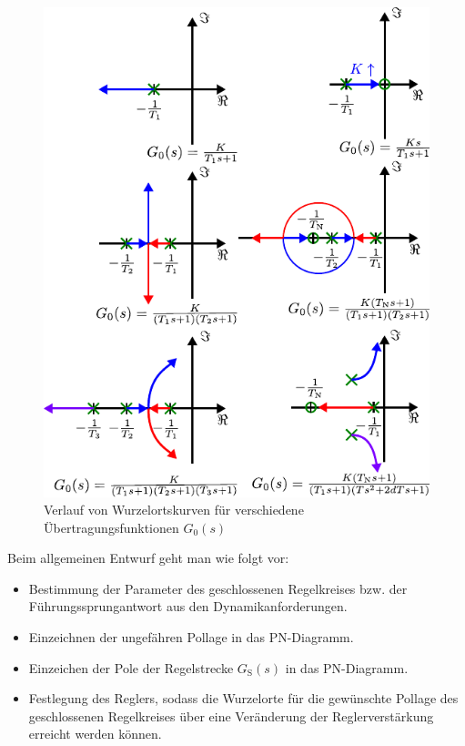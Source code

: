 %
\begin{figure}
	\centering
	\includegraphics[width=0.8\linewidth]{Abbildungen/Reglerentwurf/PDF/Wurzelortskurven.pdf}
	\caption{Verlauf von Wurzelortskurven für verschiedene Übertragungsfunktionen $G_{0}(s)$}
	\label{fig:wurzelortskurve}
\end{figure}
%
Beim allgemeinen Entwurf geht man wie folgt vor:
%
\begin{itemize}
	\item Bestimmung der Parameter des geschlossenen Regelkreises bzw. der Führungssprungantwort aus den Dynamikanforderungen.
	\item Einzeichnen der ungefähren Pollage in das PN-Diagramm.
	\item Einzeichen der Pole der Regelstrecke $G_{\text{S}}(s)$ in das PN-Diagramm.
	\item Festlegung des Reglers, sodass die Wurzelorte für die gewünschte Pollage des geschlossenen Regelkreises über eine Veränderung der Reglerverstärkung erreicht werden können.
\end{itemize}
%

